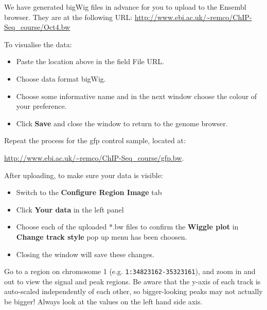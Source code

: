 \begin{steps}
We have generated bigWig files in advance for you to upload to the Ensembl
browser. They are at the following URL:
\url{http://www.ebi.ac.uk/~remco/ChIP-Seq_course/Oct4.bw}

To visualise the data:
\begin{itemize}
	\item Paste the location above in the field File URL. 
	\item Choose data format bigWig. 
	\item Choose some informative name and in the next window choose the colour of your preference. 
	\item Click \textbf{Save} and close the window to return to the genome browser. 
\end{itemize}
Repeat the process for the gfp control sample, located at:

\url{http://www.ebi.ac.uk/~remco/ChIP-Seq_course/gfp.bw}.

After uploading, to make sure your data is visible:
\begin{itemize}
        \item Switch to the \textbf{Configure Region Image} tab
        \item Click \textbf{Your data} in the left panel
        \item Choose each of the uploaded *.bw files to confirm the \textbf{Wiggle plot} in \textbf{Change track style} pop up menu has been choosen.
        \item Closing the window will save these changes.

\end{itemize}

Go to a region on chromosome 1 (e.g. \texttt{1:34823162-35323161}), and zoom in and out
to view the signal and peak regions. Be aware that the y-axis of each track is auto-scaled independently of each other,
so bigger-looking peaks may not actually be bigger! Always look at the values
on the left hand side axis.
\end{steps}

